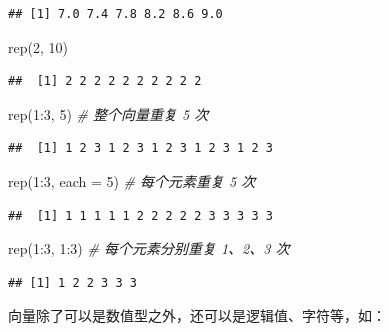 \documentclass[
  b5paper,
  UTF8,twoside]{book}
\newenvironment{Shaded}{\begin{snugshade}}{\end{snugshade}}
\newcommand{\AttributeTok}[1]{\textcolor[rgb]{0.77,0.63,0.00}{#1}}
\newcommand{\CommentTok}[1]{\textcolor[rgb]{0.56,0.35,0.01}{\textit{#1}}}
\newcommand{\DecValTok}[1]{\textcolor[rgb]{0.00,0.00,0.81}{#1}}
\newcommand{\FunctionTok}[1]{\textcolor[rgb]{0.00,0.00,0.00}{#1}}
\newcommand{\NormalTok}[1]{#1}
\newcommand{\SpecialCharTok}[1]{\textcolor[rgb]{0.00,0.00,0.00}{#1}}
\begin{document}
\begin{verbatim}
## [1] 7.0 7.4 7.8 8.2 8.6 9.0
\end{verbatim}

\begin{Shaded}
\begin{Highlighting}[]
\FunctionTok{rep}\NormalTok{(}\DecValTok{2}\NormalTok{, }\DecValTok{10}\NormalTok{)}
\end{Highlighting}
\end{Shaded}

\begin{verbatim}
##  [1] 2 2 2 2 2 2 2 2 2 2
\end{verbatim}

\begin{Shaded}
\begin{Highlighting}[]
\FunctionTok{rep}\NormalTok{(}\DecValTok{1}\SpecialCharTok{:}\DecValTok{3}\NormalTok{, }\DecValTok{5}\NormalTok{) }\CommentTok{\# 整个向量重复 5 次}
\end{Highlighting}
\end{Shaded}

\begin{verbatim}
##  [1] 1 2 3 1 2 3 1 2 3 1 2 3 1 2 3
\end{verbatim}

\begin{Shaded}
\begin{Highlighting}[]
\FunctionTok{rep}\NormalTok{(}\DecValTok{1}\SpecialCharTok{:}\DecValTok{3}\NormalTok{, }\AttributeTok{each =} \DecValTok{5}\NormalTok{) }\CommentTok{\# 每个元素重复 5 次}
\end{Highlighting}
\end{Shaded}

\begin{verbatim}
##  [1] 1 1 1 1 1 2 2 2 2 2 3 3 3 3 3
\end{verbatim}

\begin{Shaded}
\begin{Highlighting}[]
\FunctionTok{rep}\NormalTok{(}\DecValTok{1}\SpecialCharTok{:}\DecValTok{3}\NormalTok{, }\DecValTok{1}\SpecialCharTok{:}\DecValTok{3}\NormalTok{) }\CommentTok{\# 每个元素分别重复 1、2、3 次}
\end{Highlighting}
\end{Shaded}

\begin{verbatim}
## [1] 1 2 2 3 3 3
\end{verbatim}

向量除了可以是数值型之外，还可以是逻辑值、字符等，如：
\end{document}
